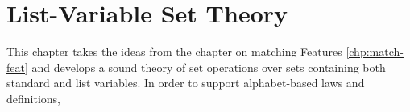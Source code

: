\chapter{List-Variable Set Theory}\label{chp:lvar-set-theory}

This chapter takes the ideas from the chapter on matching Features
\ref{chp:match-feat}
and develops a sound theory of set operations over sets containing
both standard and list variables.
In order to support alphabet-based laws and definitions,
